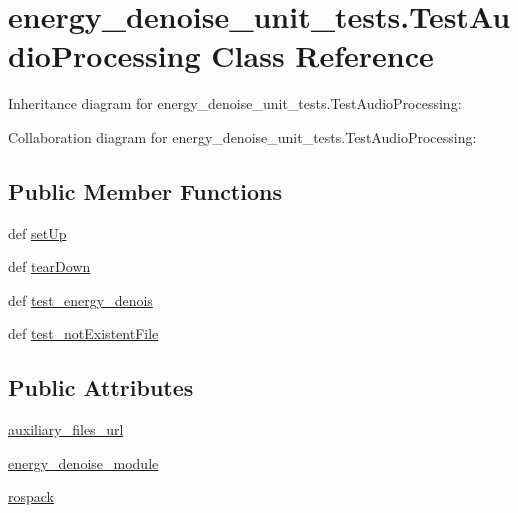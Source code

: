 \hypertarget{classenergy__denoise__unit__tests_1_1TestAudioProcessing}{\section{energy\-\_\-denoise\-\_\-unit\-\_\-tests.\-Test\-Audio\-Processing Class Reference}
\label{classenergy__denoise__unit__tests_1_1TestAudioProcessing}
}


Inheritance diagram for energy\-\_\-denoise\-\_\-unit\-\_\-tests.\-Test\-Audio\-Processing\-:


Collaboration diagram for energy\-\_\-denoise\-\_\-unit\-\_\-tests.\-Test\-Audio\-Processing\-:
\subsection*{Public Member Functions}
\begin{DoxyCompactItemize}
\item 
def \hyperlink{classenergy__denoise__unit__tests_1_1TestAudioProcessing_a44c374336e29472cc652b67ab0dada30}{set\-Up}
\item 
def \hyperlink{classenergy__denoise__unit__tests_1_1TestAudioProcessing_a55c6e949339b8570f70110a175ceec0f}{tear\-Down}
\item 
def \hyperlink{classenergy__denoise__unit__tests_1_1TestAudioProcessing_a811ed04be3321882fa8eb15be7762718}{test\-\_\-energy\-\_\-denois}
\item 
def \hyperlink{classenergy__denoise__unit__tests_1_1TestAudioProcessing_a0b6da8782f3e5ed188fae3be9a051616}{test\-\_\-not\-Existent\-File}
\end{DoxyCompactItemize}
\subsection*{Public Attributes}
\begin{DoxyCompactItemize}
\item 
\hyperlink{classenergy__denoise__unit__tests_1_1TestAudioProcessing_a90a81b0f2553ca8b64eb8b430ec0b61f}{auxiliary\-\_\-files\-\_\-url}
\item 
\hyperlink{classenergy__denoise__unit__tests_1_1TestAudioProcessing_acccf9990be3626520addd73fdbaaf4ea}{energy\-\_\-denoise\-\_\-module}
\item 
\hyperlink{classenergy__denoise__unit__tests_1_1TestAudioProcessing_a25b1514d4fd69a373b58def2b5c76719}{rospack}
\end{DoxyCompactItemize}


